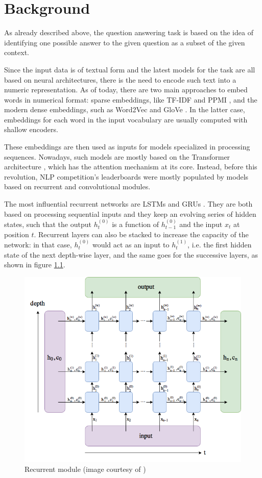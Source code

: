 \documentclass[a4paper,10pt]{report}
\begin{document}
\chapter{Background}\label{chap:background}

As already described above, the question answering task is based on the idea of identifying one possible answer to the given question as a subset of the given context.

Since the input data is of textual form and the latest models for the task are all based on neural architectures, there is the need to encode such text into a numeric representation. As of today, there are two main approaches to embed words in numerical format: sparse embeddings, like TF-IDF \cite{tf-idf} and PPMI \cite{ppmi}, and the modern dense embeddings, such as Word2Vec \cite{word2vec} and GloVe \cite{glove}. In the latter case, embeddings for each word in the input vocabulary are usually computed with shallow encoders.

These embeddings are then used as inputs for models specialized in processing sequences. Nowadays, such models are mostly based on the Transformer architecture \cite{transformers}, which has the attention mechanism at its core. Instead, before this revolution, NLP competition's leaderboards were mostly populated by models based on recurrent and convolutional modules.

The most influential recurrent networks are LSTMs \cite{lstm} and GRUs \cite{gru}. They are both based on processing sequential inputs and they keep an evolving series of hidden states, such that the output $h_t^{(0)}$ is a function of $h_{t-1}^{(0)}$ and the input $x_t$ at position $t$. Recurrent layers can also be stacked to increase the capacity of the network: in that case, $h_t^{(0)}$ would act as an input to $h_t^{(1)}$, i.e. the first hidden state of the next depth-wise layer, and the same goes for the successive layers, as shown in figure \ref{fig:recurrent}.

\begin{figure}[h]
  \center
  \includegraphics[width=0.65\linewidth]{recurrent}
  \caption{Recurrent module (image courtesy of \cite{recurrent-img})}
  \label{fig:recurrent}
\end{figure}
\end{document}

